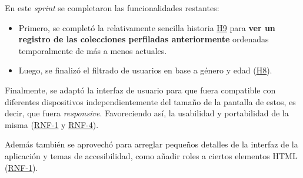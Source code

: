 En este \textit{sprint} se completaron las funcionalidades restantes:
\begin{itemize}
    \item Primero, se completó la relativamente sencilla historia \hyperref[tab:user-stories]{H9} para \textbf{ver un registro de las colecciones perfiladas anteriormente} ordenadas temporalmente de más a menos actuales.
    \item Luego, se finalizó el filtrado de usuarios en base a género y edad (\hyperref[tab:user-stories]{H8}).%
\end{itemize}

Finalmente, se adaptó la interfaz de usuario para que fuera compatible con diferentes dispositivos independientemente del tamaño de la pantalla de estos, es decir, que fuera \textit{responsive}. Favoreciendo así, la usabilidad y portabilidad de la misma (\hyperref[tab:rnf]{RNF-1} y \hyperref[tab:rnf]{RNF-4}).

Además también se aprovechó para arreglar pequeños detalles de la interfaz de la aplicación y temas de accesibilidad, como añadir roles a ciertos elementos HTML (\hyperref[tab:rnf]{RNF-1}).
